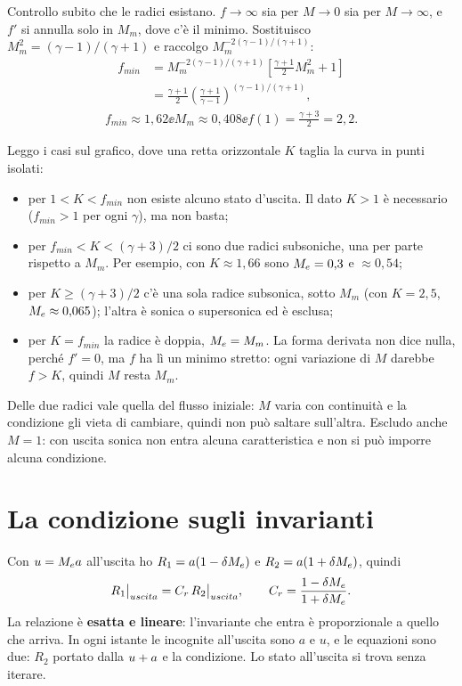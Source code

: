 Controllo subito che le radici esistano. $f\to\infty$ sia per $M\to0$ sia per $M\to\infty$, e $f'$ si annulla solo
in $M_m$, dove c'è il minimo. Sostituisco $M_m^2=(\gamma-1)/(\gamma+1)$ e raccolgo $M_m^{-2(\gamma-1)/(\gamma+1)}$:
\begin{align*}
  f_{min}&=M_m^{-2(\gamma-1)/(\gamma+1)}\left[\frac{\gamma+1}{2}M_m^2+1\right]\\
  &=\frac{\gamma+1}{2}\left(\frac{\gamma+1}{\gamma-1}\right)^{(\gamma-1)/(\gamma+1)},
\end{align*}
\begin{gather*}
  f_{min}\approx1{,}62 \ee M_m\approx0{,}408 \ee f(1)=\frac{\gamma+3}{2}=2{,}2 .
\end{gather*}


Leggo i casi sul grafico, dove una retta orizzontale $K$ taglia la curva in punti isolati:
\begin{itemize}
  \item per $1<K<f_{min}$ non esiste alcuno stato d'uscita. Il dato $K>1$ è necessario ($f_{min}>1$ per ogni
        $\gamma$), ma non basta;
  \item per $f_{min}<K<(\gamma+3)/2$ ci sono due radici subsoniche, una per parte rispetto a $M_m$. Per esempio, con
        $K\approx1{,}66$ sono $M_e=0{,}3$ e $\approx0{,}54$;
  \item per $K\ge(\gamma+3)/2$ c'è una sola radice subsonica, sotto $M_m$ (con $K=2{,}5$, $M_e\approx0{,}065$); l'altra
        è sonica o supersonica ed è esclusa;
  \item per $K=f_{min}$ la radice è doppia, $M_e=M_m$. La forma derivata non dice nulla, perché $f'=0$, ma $f$ ha lì
        un minimo stretto: ogni variazione di $M$ darebbe $f>K$, quindi $M$ resta $M_m$.
\end{itemize}
Delle due radici vale quella del flusso iniziale: $M$ varia con continuità e la condizione gli vieta di cambiare,
quindi non può saltare sull'altra. Escludo anche $M=1$: con uscita sonica non entra alcuna caratteristica e non si
può imporre alcuna condizione.

\section*{La condizione sugli invarianti}
Con $u=M_e a$ all'uscita ho $R_1=a(1-\delta M_e)$ e $R_2=a(1+\delta M_e)$, quindi
\begin{gather*}
  R_1\big|_{uscita}=C_r\,R_2\big|_{uscita} ,\qquad C_r=\frac{1-\delta M_e}{1+\delta M_e}.
\end{gather*}
La relazione è \textbf{esatta e lineare}: l'invariante che entra è proporzionale a quello che arriva. In ogni istante
le incognite all'uscita sono $a$ e $u$, e le equazioni sono due: $R_2$ portato dalla $u+a$ e la condizione. Lo stato
all'uscita si trova senza iterare.

